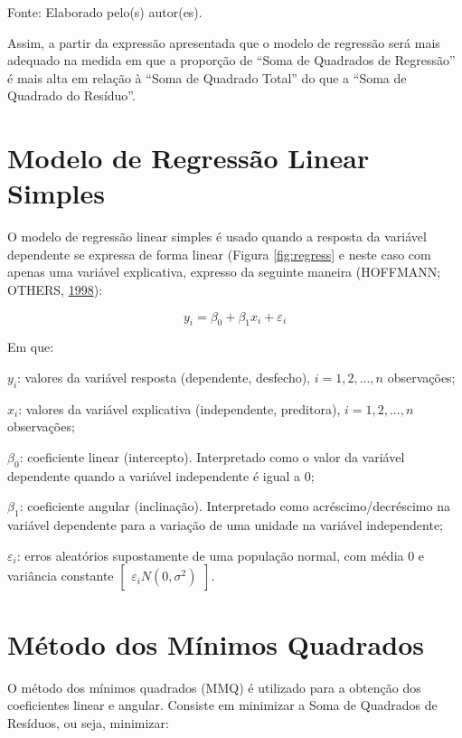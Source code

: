\documentclass[12pt,brazil,oneside]{book}
\begin{document}
Fonte: Elaborado pelo(s) autor(es).

Assim, a partir da expressão apresentada que o modelo de regressão será
mais adequado na medida em que a proporção de ``Soma de Quadrados de
Regressão'' é mais alta em relação à ``Soma de Quadrado Total'' do que a
``Soma de Quadrado do Resíduo''.

\hypertarget{modelo-de-regressao-linear-simples}{%
\section{Modelo de Regressão Linear
Simples}\label{modelo-de-regressao-linear-simples}}

O modelo de regressão linear simples é usado quando a resposta da
variável dependente se expressa de forma linear (Figura
\ref{fig:regress} e neste caso com apenas uma variável explicativa,
expresso da seguinte maneira (HOFFMANN; OTHERS,
\protect\hyperlink{ref-hoffmann1998}{1998}):

\[
y_i=\beta_0+\beta_1x_i+\varepsilon _i
\]

Em que:

\(y_i\): valores da variável resposta (dependente, desfecho),
\(i = 1,2,...,n\) observações;

\(x_i\): valores da variável explicativa (independente, preditora),
\(i = 1,2,...,n\) observações;

\(\beta_0\): coeficiente linear (intercepto). Interpretado como o valor
da variável dependente quando a variável independente é igual a 0;

\(\beta_1\): coeficiente angular (inclinação). Interpretado como
acréscimo/decréscimo na variável dependente para a variação de uma
unidade na variável independente;

\(\varepsilon_i\): erros aleatórios supostamente de uma população
normal, com média 0 e variância constante
\(\begin{bmatrix}\varepsilon_i N(0, \sigma^2)\end{bmatrix}\).

\hypertarget{metodo-dos-minimos-quadrados}{%
\section{Método dos Mínimos
Quadrados}\label{metodo-dos-minimos-quadrados}}

O método dos mínimos quadrados (MMQ) é utilizado para a obtenção dos
coeficientes linear e angular. Consiste em minimizar a Soma de Quadrados
de Resíduos, ou seja, minimizar:
\end{document}
